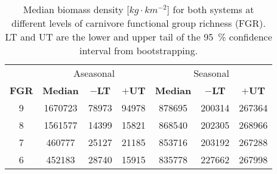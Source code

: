 \begin{table}[ht!]
\centering
\caption[Median biomass density at different levels of function group richness]{Median biomass density [$kg\cdot km^{-2}$] for both
               systems at different levels of carnivore functional group richness
               (FGR). LT and UT are the lower and upper tail of the 95~\%
               confidence interval from bootstrapping.} 
\label{tab:chap:res:median}
\begin{tabular*}{\textwidth}{@{\extracolsep{\fill} }ccccccc}
  \toprule
  & \multicolumn{3}{c}{Aseasonal} & \multicolumn{3}{c}{Seasonal} \\ \cmidrule{2-4} \cmidrule{5-7}
\textbf{FGR} & \textbf{Median} & \textbf{$-$LT} & \textbf{$+$UT} & \textbf{Median} & \textbf{$-$LT} & \textbf{$+$UT} \\ 
  \midrule
  9 & 1670723 & 78973 & 94978 & 878695 & 200314 & 267364 \\ 
    8 & 1561577 & 14399 & 15821 & 868540 & 202305 & 268966 \\ 
    7 & 460777 & 25127 & 21185 & 853716 & 203192 & 267288 \\ 
    6 & 452183 & 28740 & 15915 & 835778 & 227662 & 267998 \\ 
   \bottomrule
\end{tabular*}
\end{table}
